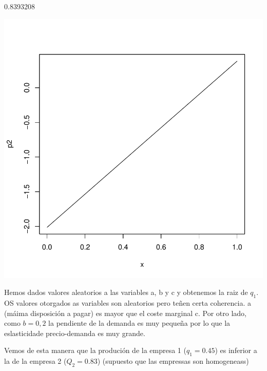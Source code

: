\documentclass{article}
\begin{document}
\begin{Schunk}
\begin{Soutput}
[1] 0.8393208
\end{Soutput}
\end{Schunk}
\includegraphics{PUTAPRUEBA-004}



Hemos dados valores aleatorios a las variables a, b y c y obtenemos la raiz de $q_1$. OS valores otorgados as variables son aleatorios pero teñen certa coherencia. a (m\'aima disposici\'on a pagar) es mayor que el coste marginal c. Por otro lado, como $b=0,2$ la pendiente de la demanda es muy pequeña por lo que la eslasticidade precio-demanda es muy grande.

Vemos de esta manera que la produci\'on de la empresa 1 ($q_1=0.45$) es inferior a la de la empresa 2 ($Q_2=0.83$) (supuesto que las empressas son homogeneass)
\end{document}
